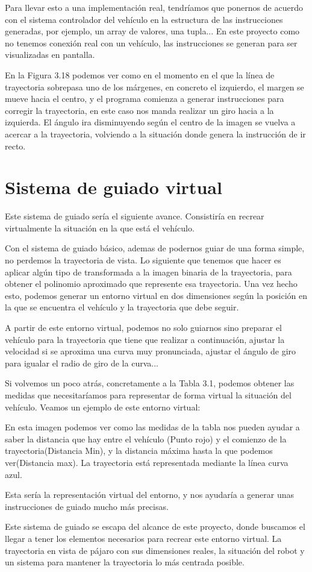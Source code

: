 Para llevar esto a una implementación real, tendríamos que ponernos de acuerdo con el sistema controlador del vehículo en la estructura de las instrucciones generadas, por ejemplo, un array de valores, una tupla... 
En este proyecto como no tenemos conexión real con un vehículo, las instrucciones se generan para ser visualizadas en pantalla.


En la Figura 3.18 podemos ver como en el momento en el que la línea de trayectoria sobrepasa uno de los márgenes, en concreto el izquierdo, el margen se mueve hacia el centro, y el programa comienza a generar instrucciones para corregir la trayectoria, en este caso nos manda realizar un giro hacia a la izquierda. El ángulo ira disminuyendo según el centro de la imagen se vuelva a acercar a la trayectoria, volviendo a la situación donde genera la instrucción de ir recto.


\section{Sistema de guiado virtual}
Este sistema de guiado sería el siguiente avance. Consistiría en recrear virtualmente la situación en la que está el vehículo. 

Con el sistema de guiado básico, ademas de podernos guiar de una forma simple, no perdemos la trayectoria de vista. Lo siguiente que tenemos que hacer es aplicar algún tipo de transformada a la imagen binaria de la trayectoria, para obtener el polinomio aproximado que represente esa trayectoria. Una vez hecho esto, podemos generar un entorno virtual en dos dimensiones según la posición en la que se encuentra el vehículo y la trayectoria que debe seguir.

A partir de este entorno virtual, podemos no solo guiarnos sino preparar el vehículo para la trayectoria que tiene que realizar a continuación, ajustar la velocidad si se aproxima una curva muy pronunciada, ajustar el ángulo de giro para igualar el radio de giro de la curva...

Si volvemos un poco atrás, concretamente a la Tabla 3.1, podemos obtener las medidas que necesitaríamos para representar de forma virtual la situación del vehículo. Veamos un ejemplo de este entorno virtual:


En esta imagen podemos ver como las medidas de la tabla nos pueden ayudar a saber la distancia que hay entre el vehículo (Punto rojo) y el comienzo de la trayectoria(Distancia Min), y la distancia máxima hasta la que podemos ver(Distancia max). La trayectoria está representada mediante la línea curva azul.

Esta sería la representación virtual del entorno, y nos ayudaría a generar unas instrucciones de guiado mucho más precisas. 

Este sistema de guiado se escapa del alcance de este proyecto, donde buscamos el llegar a tener los elementos necesarios para recrear este entorno virtual. La trayectoria en vista de pájaro con sus dimensiones reales, la situación del robot y un sistema para mantener la trayectoria lo más centrada posible.
